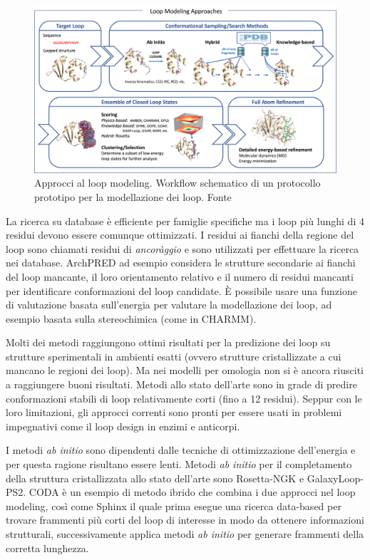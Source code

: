 {{\begin{figure}[!htb]
	\centering
	\includegraphics[scale=1]{images/loop-modeling-approaches.jpg}
	\caption{Approcci al loop modeling. Workflow schematico di un protocollo prototipo per la modellazione dei loop. Fonte\cite{barozet2021current}}
	\label{fig:loop-modeling-approaches}
\end{figure}

La ricerca su database è efficiente per famiglie specifiche ma i loop più lunghi di 4 residui devono essere comunque ottimizzati. I residui ai fianchi della regione del loop sono chiamati residui di \textit{ancoràggio} e sono utilizzati per effettuare la ricerca nei database. ArchPRED ad esempio considera le strutture secondarie ai fianchi del loop mancante, il loro orientamento relativo e il numero di residui mancanti per identificare conformazioni del loop candidate. È possibile usare una funzione di valutazione basata sull'energia per valutare la modellazione dei loop, ad esempio basata sulla stereochimica (come in CHARMM). 

\par Molti dei metodi raggiungono ottimi risultati per la predizione dei loop su strutture sperimentali in ambienti esatti (ovvero strutture cristallizzate a cui mancano le regioni dei loop). Ma nei modelli per omologia non si è ancora riusciti a raggiungere buoni risultati\supercite{karami2018dareus}. Metodi allo stato dell'arte sono in grade di predire conformazioni stabili di loop relativamente corti (fino a 12 residui)\supercite{barozet2021current}.
Seppur con le loro limitazioni, gli approcci correnti sono pronti per essere usati in problemi impegnativi come il loop design in enzimi e anticorpi.

\par I metodi \textit{ab initio} sono dipendenti dalle tecniche di ottimizzazione dell'energia e per questa ragione risultano essere lenti. Metodi \textit{ab initio} per il completamento della struttura cristallizzata allo stato dell'arte sono Rosetta-NGK e GalaxyLoop-PS2. CODA è un esempio di metodo ibrido che combina i due approcci nel loop modeling, così come Sphinx il quale prima esegue una ricerca data-based per trovare frammenti più corti del loop di interesse in modo da ottenere informazioni strutturali, successivamente applica metodi \textit{ab initio} per generare frammenti della corretta lunghezza. \\

}}
